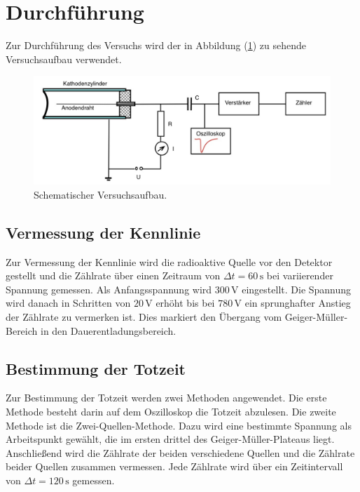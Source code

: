 \section{Durchführung}
\label{sec:Durchführung}
Zur Durchführung des Versuchs wird der in Abbildung (\ref{fig:Versuchsaufbau}) zu sehende Versuchsaufbau
verwendet. 
\begin{figure}[H]
    \centering
    \includegraphics[width=\textwidth]{content/Bilder/Gesamte_Schaltung.jpeg}
    \caption{Schematischer Versuchsaufbau. \cite{anleitungV703}}
    \label{fig:Versuchsaufbau}
\end{figure}
\subsection{Vermessung der Kennlinie}
Zur Vermessung der Kennlinie wird die radioaktive Quelle 
vor den Detektor gestellt und die Zählrate über einen 
Zeitraum von $\Delta t = 60 \, \unit{\second}$ bei variierender
Spannung gemessen. Als Anfangsspannung wird $300 \, \unit{\volt}$
eingestellt. Die Spannung wird danach in Schritten von $20 \, \unit{\volt}$
erhöht bis bei $780 \, \unit{\volt}$ ein sprunghafter Anstieg der
Zählrate zu vermerken ist. Dies markiert den Übergang vom Geiger-Müller-Bereich 
in den Dauerentladungsbereich. 
\subsection{Bestimmung der Totzeit}
Zur Bestimmung der Totzeit werden zwei Methoden angewendet. Die erste Methode besteht 
darin auf dem Oszilloskop die Totzeit abzulesen. 
Die zweite Methode ist die Zwei-Quellen-Methode. Dazu wird eine bestimmte Spannung als
Arbeitspunkt gewählt, die im ersten drittel des Geiger-Müller-Plateaus liegt. Anschließend
wird die Zählrate der beiden verschiedene Quellen und die Zählrate beider Quellen 
zusammen vermessen. Jede Zählrate wird über ein Zeitintervall von 
$\Delta t = 120 \, \unit{\second}$ gemessen. 
